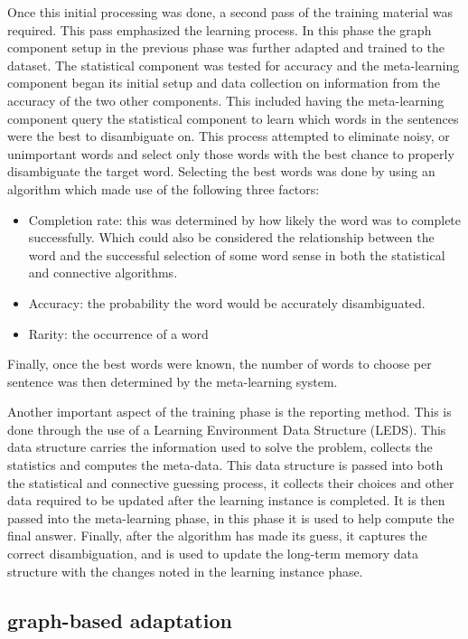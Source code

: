 Once this initial processing was done, a second pass of the training material was required.  This pass emphasized the learning process.  In this phase the graph component setup in the previous phase was further adapted and trained to the dataset.  The statistical component was tested for accuracy and the meta-learning component began its initial setup and data collection on information from the accuracy of the two other components. This included having the meta-learning component query the statistical component to learn which words in the sentences were the best to disambiguate on. This process attempted to eliminate noisy, or unimportant words and select only those words with the best chance to properly disambiguate the target word.  Selecting the best words was done by using an algorithm which made use of the following three factors:

\begin{itemize}
	\item Completion rate: this was determined by how likely the word was to complete successfully. Which could also be considered the relationship between the word and the successful selection of some word sense in both the statistical and connective algorithms. 
	\item Accuracy: the probability the word would be accurately disambiguated.
	\item Rarity: the occurrence of a word
\end{itemize}

Finally, once the best words were known, the number of words to choose per sentence was then determined by the meta-learning system. 

Another important aspect of the training phase is the reporting method.  This is done through the use of a Learning Environment Data Structure (LEDS).  This data structure carries the information used to solve the problem, collects the statistics and computes the meta-data. This data structure is passed into both the statistical and connective guessing process, it collects their choices and other data required to be updated after the learning instance is completed.  It is then passed into the meta-learning phase, in this phase it is used to help compute the final answer. Finally, after the algorithm has made its guess, it captures the correct disambiguation, and is used to update the long-term memory data structure with the changes noted in the learning instance phase.

\subsection{graph-based adaptation}


